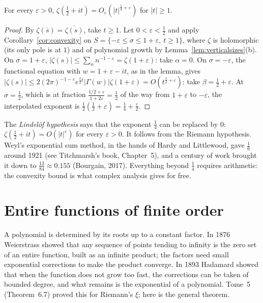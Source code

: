 \begin{theorem}\label{thm:convexzeta}
For every $\varepsilon>0$, $\zeta(\frac12+it)=O_\varepsilon(|t|^{\frac14+\varepsilon})$ for $|t|\ge1$.
\end{theorem}
\begin{proof}
By $\zeta(\overline s)=\overline{\zeta(s)}$, take $t\ge1$. Let $0<\varepsilon<\frac12$ and apply Corollary~\ref{cor:convexity} on $S=\{-\varepsilon\le\sigma\le1+\varepsilon,\ t\ge1\}$, where $\zeta$ is holomorphic (its only pole is
at $1$) and of polynomial growth by Lemma~\ref{lem:verticalsizes}(b). On $\sigma=1+\varepsilon$, $|\zeta(s)|\le\sum_nn^{-1-\varepsilon}=\zeta(1+\varepsilon)$: take $\alpha=0$. On $\sigma=-\varepsilon$, the functional equation with
$w=1+\varepsilon-it$, as in the lemma, gives $|\zeta(s)|\le2(2\pi)^{-1-\varepsilon}e^{\frac\pi2t}|\Gamma(w)|\zeta(1+\varepsilon)=O(t^{\frac12+\varepsilon})$: take $\beta=\frac12+\varepsilon$. At $\sigma=\frac12$, which is at fraction
$\frac{1/2+\varepsilon}{1+2\varepsilon}=\frac12$ of the way from $1+\varepsilon$ to $-\varepsilon$, the interpolated exponent is $\frac12(\frac12+\varepsilon)=\frac14+\frac\varepsilon2$.
\end{proof}

\begin{remark}
The \emph{Lindel\"of hypothesis} says that the exponent $\frac14$ can be replaced by $0$: $\zeta(\frac12+it)=O(|t|^\varepsilon)$ for every $\varepsilon>0$. It follows from the Riemann hypothesis. Weyl's
exponential sum method, in the hands of Hardy and Littlewood, gave $\frac16$ around 1921 (see Titchmarsh's book, Chapter~5), and a century of work brought it down to $\frac{13}{84}\approx0.155$ (Bourgain, 2017). Everything beyond
$\frac14$ requires arithmetic: the convexity bound is what complex analysis gives for free.
\end{remark}

\section{Entire functions of finite order}

A polynomial is determined by its roots up to a constant factor. In 1876 Weierstrass showed that any sequence of points tending to infinity is the zero set of an entire function, built as an
infinite product; the factors need small exponential corrections to make the product converge. In 1893 Hadamard showed that when the function does not grow too fast, the corrections can be
taken of bounded degree, and what remains is the exponential of a polynomial. Tome~5 (Theorem~6.7) proved this for Riemann's $\xi$; here is the general theorem.

